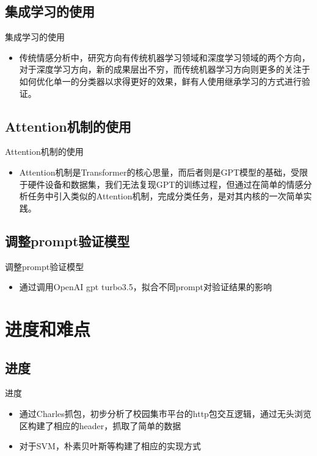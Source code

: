 \documentclass[UTF8]{ctexbeamer}
\begin{document}
\subsection{集成学习的使用}
\begin{frame}{集成学习的使用}
  \begin{itemize}
  \item {
    传统情感分析中，研究方向有传统机器学习领域和深度学习领域的两个方向，对于深度学习方向，新的成果层出不穷，而传统机器学习方向则更多的关注于如何优化单一的分类器以求得更好的效果，鲜有人使用继承学习的方式进行验证。
  }
    \end{itemize}
\end{frame}

\subsection{Attention机制的使用}
\begin{frame}{Attention机制的使用}
   \begin{itemize}
 \item {
    Attention机制是Transformer的核心思量，而后者则是GPT模型的基础，受限于硬件设备和数据集，我们无法复现GPT的训练过程，但通过在简单的情感分析任务中引入类似的Attention机制，完成分类任务，是对其内核的一次简单实践。
  }
  \end{itemize}
\end{frame}
  
\subsection{调整prompt验证模型}

\begin{frame}{调整prompt验证模型}
   \begin{itemize}
 \item {
    通过调用OpenAI gpt turbo3.5，拟合不同prompt对验证结果的影响
  }
  \end{itemize}
\end{frame}



\section{进度和难点}

\subsection{进度}
\begin{frame}{进度}
  \begin{itemize}
  \item {
    通过Charles抓包，初步分析了校园集市平台的http包交互逻辑，通过无头浏览区构建了相应的header，抓取了简单的数据
  }
  \item {
    对于SVM，朴素贝叶斯等构建了相应的实现方式
  }
   \end{itemize}
\end{frame}
\end{document}
